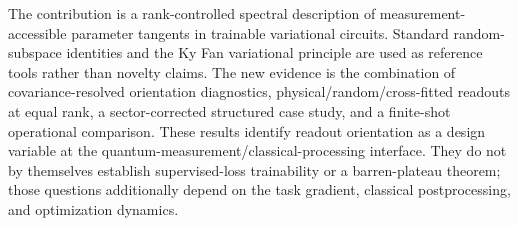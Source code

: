 The contribution is a rank-controlled spectral description of measurement-accessible parameter tangents in trainable variational circuits. Standard random-subspace identities and the Ky Fan variational principle are used as reference tools rather than novelty claims. The new evidence is the combination of covariance-resolved orientation diagnostics, physical/random/cross-fitted readouts at equal rank, a sector-corrected structured case study, and a finite-shot operational comparison. These results identify readout orientation as a design variable at the quantum-measurement/classical-processing interface. They do not by themselves establish supervised-loss trainability or a barren-plateau theorem; those questions additionally depend on the task gradient, classical postprocessing, and optimization dynamics.

